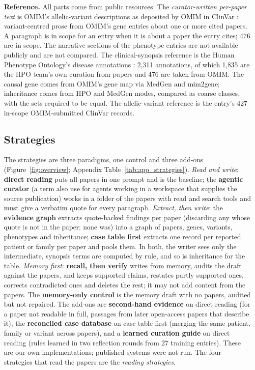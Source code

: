 \documentclass{article} %
\begin{document}
\textbf{Reference.} All parts come from public resources. The \emph{curator-written per-paper text} is OMIM's allelic-variant descriptions as deposited by OMIM in ClinVar \citep{landrum2025clinvar}: variant-centred prose from OMIM's gene entries about one or more cited papers. A paragraph is in scope for an entry when it is about a paper the entry cites; 476 are in scope. The narrative sections of the phenotype entries are not available publicly and are not compared. The clinical-synopsis reference is the Human Phenotype Ontology's disease annotations \citep{gargano2024human}: 2,311 annotations, of which 1,835 are the HPO team's own curation from papers and 476 are taken from OMIM. The causal gene comes from OMIM's gene map via MedGen \citep{Louden2020MedgenNcbis} and mim2gene; inheritance comes from HPO and MedGen modes, compared as coarse classes, with the sets required to be equal. The allelic-variant reference is the entry's 427 in-scope OMIM-submitted ClinVar records.

\subsection{Strategies}
\label{sec:strategies}
The strategies are three paradigms, one control and three add-ons (Figure~\ref{fig:overview}; Appendix Table~\ref{tab:app_strategies}). \emph{Read and write}: \textbf{direct reading} puts all papers in one prompt and is the baseline; the \textbf{agentic curator} (a term \citet{balhoff2026frontier} also use for agents working in a workspace that supplies the source publication) works in a folder of the papers with read and search tools and must give a verbatim quote for every paragraph. \emph{Extract, then write}: the \textbf{evidence graph} extracts quote-backed findings per paper (discarding any whose quote is not in the paper; none was) into a graph of papers, genes, variants, phenotypes and inheritance; \textbf{case table first} extracts one record per reported patient or family per paper and pools them. In both, the writer sees only the intermediate, synopsis terms are computed by rule, and so is inheritance for the table. \emph{Memory first}: \textbf{recall, then verify} writes from memory, audits the draft against the papers, and keeps supported claims, restates partly supported ones, corrects contradicted ones and deletes the rest; it may not add content from the papers. The \textbf{memory-only control} is the memory draft with no papers, audited but not repaired. The add-ons are \textbf{second-hand evidence} on direct reading (for a paper not readable in full, passages from later open-access papers that describe it), the \textbf{reconciled case database} on case table first (merging the same patient, family or variant across papers), and a \textbf{learned curation guide} on direct reading (rules learned in two reflection rounds from 27 training entries). These are our own implementations; published systems were not run. The four strategies that read the papers are the \emph{reading strategies}.
\end{document}
